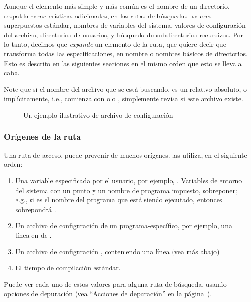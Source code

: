 \documentclass{article}
\begin{document}
Aunque el elemento más simple y más común es el nombre de un
directorio, \KPS{} respalda características adicionales, en las
rutas de búsquedas: valores superpuestos estándar, nombres de
variables del sistema, valores de configuración del archivo,
directorios de usuarios, y búsqueda de subdirectorios
recursivos. Por lo tanto, decimos que \KPS{} \emph{expande} un
elemento de la ruta, que quiere decir que transforma todas las
especificaciones, en nombre o nombres básicos de directorios.
Esto es descrito en las siguientes secciones en el mismo
orden que esto se lleva a cabo. 

Note que si el nombre del archivo que se está buscando, es un
relativo absoluto, o implícitamente, i.e., comienza con
\samp{/} o  o , \KPS{} simplemente revisa
si este archivo existe. 

\ifSingleColumn
\else
\begin{figure*}

\setlength{\abovecaptionskip}{0pt}
\caption{Un ejemplo ilustrativo de archivo de configuración}
  \label{fig:config-sample}
\end{figure*}
\fi

\subsubsection{Orígenes de la ruta}
\label{sec:path-sources}

Una ruta de acceso, puede provenir de muchos orígenes.
\KPS{} las utiliza, en el siguiente orden:

\begin{enumerate}
	\item
		Una variable especificada por el usuario, por
		ejemplo, \@. Variables de
		entorno del sistema con un punto y un nombre
		de programa impuesto, sobreponen; e.g., si
		 es el nombre del programa que
		está siendo ejecutado, entonces
		 sobrepondrá
		.
	\item
		Un archivo de configuración de un
		programa-específico, por ejem\-plo, una línea
		 en  de
		. 
	\item 
		Un archivo de configuración \KPS{}
		, conteniendo una línea
		 (vea más abajo).
	\item
		El tiempo de compilación estándar. 
\end{enumerate}
\noindent Puede ver cada uno de estos valores para alguna ruta
de búsqueda, usando opciones de depuración (vea ``Acciones de
depuración'' en la página~\pageref{sec:debugging}).
\end{document}
